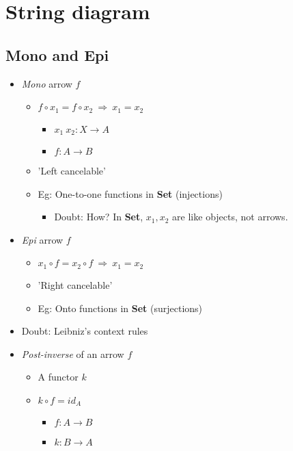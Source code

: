 \chapter{String diagram}
\section{Mono and Epi}
\begin{itemize}
  \item \emph{Mono} arrow $f$
        \begin{itemize}
          \item $f \circ x_1 = f \circ x_2\ \Rightarrow \ x_1 = x_2$
                \begin{itemize}
                  \item $x_1\ x_2 : X \to A$
                  \item $f : A \to B$
                \end{itemize}
          \item 'Left cancelable'
          \item Eg: One-to-one functions in \textbf{Set} (injections)
                \begin{itemize}
                  \item Doubt: How? In \textbf{Set}, $x_1, x_2$ are like objects,
                        not arrows.
                \end{itemize}
        \end{itemize}
  \item \emph{Epi} arrow $f$
        \begin{itemize}
          \item $x_1 \circ f = x_2 \circ f \ \Rightarrow \ x_1 = x_2$
          \item 'Right cancelable'
          \item Eg: Onto functions in \textbf{Set} (surjections)
        \end{itemize}
  \item Doubt: Leibniz's context rules
  \item \emph{Post-inverse} of an arrow $f$
        \begin{itemize}
          \item A functor $k$
          \item $k \circ f = id_A$
                \begin{itemize}
                  \item $f : A \to B$
                  \item $k : B \to A$

\end{itemize}
\end{itemize}
\end{itemize}
